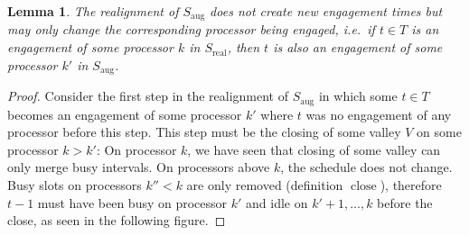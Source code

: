 \documentclass[a4paper]{article}
\DeclareMathOperator{\aug}{aug}
\DeclareMathOperator{\real}{real}
\DeclareMathOperator{\close}{close}
\newtheorem{lemma}[theorem]{Lemma}
\begin{document}
\begin{lemma}\label{lemma:engagements}
  The realignment of $S_{\aug}$ does not create new engagement times but may only change the corresponding processor being engaged, i.e.\ if $t \in T$ is an engagement of some processor $k$ in $S_{\real}$, then $t$ is also an engagement of some processor $k'$ in $S_{\aug}$.
\end{lemma}
\begin{proof}
  Consider the first step in the realignment of $S_{\aug}$ in which some $t \in T$ becomes an engagement of some processor $k'$ where $t$ was no engagement of any processor before this step.
  This step must be the closing of some valley $V$ on some processor $k > k'$:
  On processor $k$, we have seen that closing of some valley can only merge busy intervals.
  On processors above $k$, the schedule does not change.
  Busy slots on processors $k'' < k$ are only removed (definition $\close$), therefore $t-1$ must have been busy on processor $k'$ and idle on $k' + 1, \ldots, k$ before the close, as seen in the following figure.







\end{proof}
\end{document}
